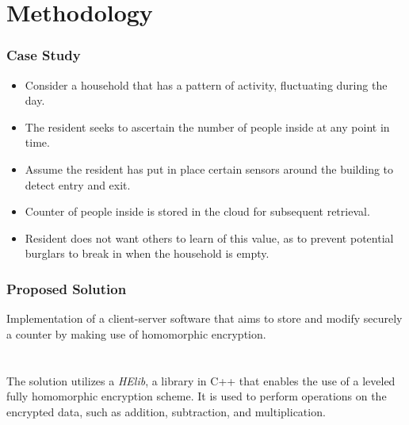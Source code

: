\documentclass{beamer}
\begin{document}
\section{Methodology}
\begin{frame}
\frametitle{Case Study}

\begin{itemize}
  \setlength\itemsep{1.5em}
\item Consider a household that has a pattern of activity, fluctuating during the day.
\item The resident seeks to ascertain the number of people inside at any point in time.
\item Assume the resident has put in place certain sensors around the building to detect entry and exit.
\item Counter of people inside is stored in the cloud for subsequent retrieval. 
\item Resident does not want others to learn of this value, as to prevent potential burglars to break in when the household is empty.
\end{itemize}
\end{frame}


\begin{frame}
\frametitle{Proposed Solution}

Implementation of a client-server software that aims to store and modify securely a counter by making use of homomorphic encryption.  \\~\\~\\

The solution utilizes a \emph{HElib}, a library in C++ that enables the use of a leveled fully homomorphic encryption scheme. It is used to perform operations on the encrypted data, such as addition, subtraction, and multiplication. \\~\\

\end{frame}
\end{document}
